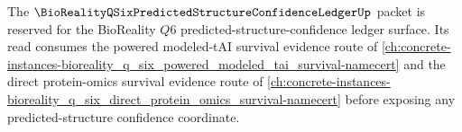 The $\BioRealityQSixPredictedStructureConfidenceLedgerUp$ packet is reserved for the BioReality $Q6$ predicted-structure-confidence ledger surface. Its read consumes the powered modeled-tAI survival evidence route of \autoref{ch:concrete-instances-bioreality_q_six_powered_modeled_tai_survival-namecert} and the direct protein-omics survival evidence route of \autoref{ch:concrete-instances-bioreality_q_six_direct_protein_omics_survival-namecert} before exposing any predicted-structure confidence coordinate.

